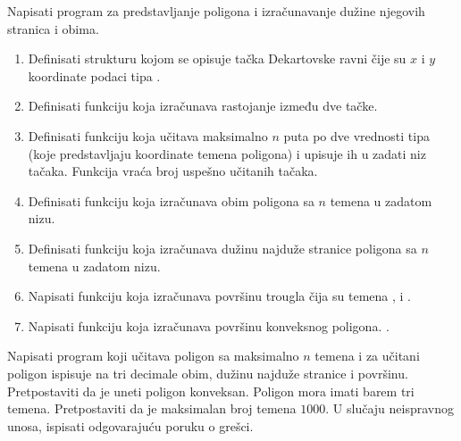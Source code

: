 \begin{Exercise}[label=struc.10] 
Napisati program za predstavljanje poligona i izračunavanje
dužine njegovih stranica i obima.
\begin{enumerate}
\item Definisati strukturu  kojom se opisuje
  tačka Dekartovske ravni čije su $x$ i $y$ koordinate podaci tipa
  .

\item Definisati funkciju 
  koja izračunava rastojanje između dve tačke.

\item Definisati funkciju  koja učitava maksimalno $n$ puta po dve
  vrednosti tipa  (koje predstavljaju koordinate temena
  poligona) i upisuje ih u zadati niz tačaka. Funkcija vraća broj
  uspešno učitanih tačaka.

\item Definisati funkciju  koja izračunava obim poligona sa $n$ temena u zadatom nizu.

\item Definisati funkciju  koja izračunava dužinu najduže stranice
  poligona sa $n$ temena u zadatom nizu.

\item Napisati funkciju  
koja izračunava površinu trougla čija su temena ,  i .

\item Napisati funkciju  
koja izračunava površinu konveksnog poligona. .
\end{enumerate}
Napisati program koji učitava poligon sa maksimalno $n$ temena
  i za učitani poligon ispisuje na tri decimale
  obim, dužinu najduže stranice i površinu. Pretpostaviti da je
  uneti poligon konveksan. Poligon mora imati barem tri temena.
  Pretpostaviti da je maksimalan broj temena $1000$.
  U slučaju neispravnog unosa, ispisati odgovarajuću poruku o grešci.


\end{Exercise}
